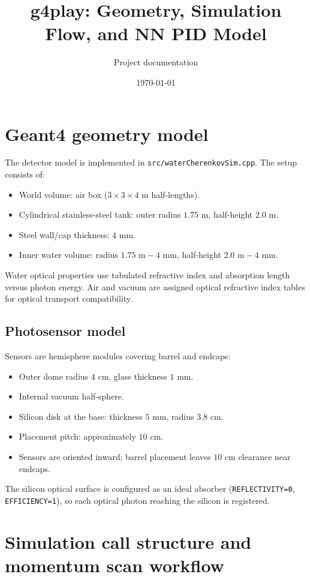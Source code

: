 \documentclass[11pt,a4paper]{article}
\title{g4play: Geometry, Simulation Flow, and NN PID Model}
\author{Project documentation}
\date{\today}
\begin{document}
\maketitle

\section{Geant4 geometry model}
The detector model is implemented in \texttt{src/waterCherenkovSim.cpp}. The setup consists of:
\begin{itemize}
  \item World volume: air box (\(3\times 3\times 4\) m half-lengths).
  \item Cylindrical stainless-steel tank: outer radius \(1.75\) m, half-height \(2.0\) m.
  \item Steel wall/cap thickness: \(4\) mm.
  \item Inner water volume: radius \(1.75\text{ m} - 4\text{ mm}\), half-height \(2.0\text{ m} - 4\text{ mm}\).
\end{itemize}

Water optical properties use tabulated refractive index and absorption length versus photon energy. Air and vacuum are assigned optical refractive index tables for optical transport compatibility.

\subsection{Photosensor model}
Sensors are hemisphere modules covering barrel and endcaps:
\begin{itemize}
  \item Outer dome radius \(4\) cm, glass thickness \(1\) mm.
  \item Internal vacuum half-sphere.
  \item Silicon disk at the base: thickness \(5\) mm, radius \(3.8\) cm.
  \item Placement pitch: approximately \(10\) cm.
  \item Sensors are oriented inward; barrel placement leaves \(10\) cm clearance near endcaps.
\end{itemize}

The silicon optical surface is configured as an ideal absorber (\texttt{REFLECTIVITY=0}, \texttt{EFFICIENCY=1}), so each optical photon reaching the silicon is registered.

\section{Simulation call structure and momentum scan workflow}
\end{document}
